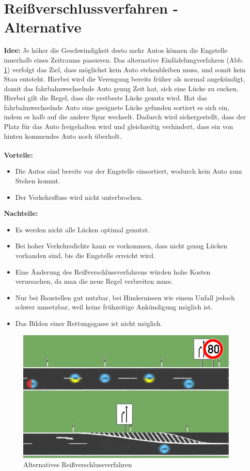 \section{Reißverschlussverfahren - Alternative}
\textbf{Idee:} Je höher die Geschwindigkeit desto mehr Autos können die Engstelle innerhalb eines Zeitraums passieren. Das alternative Einfädelungverfahren (Abb. \ref{fig:alternative}) verfolgt das Ziel, dass möglichst kein Auto stehenbleiben muss, und somit kein Stau entsteht. Hierbei wird die Verengung bereits früher als normal angekündigt, damit das fahrbahnwechselnde Auto genug Zeit hat, sich eine Lücke zu suchen. Hierbei gilt die Regel, dass die erstbeste Lücke genutz wird. Hat das fahrbahnwechselnde Auto eine geeignete Lücke gefunden sortiert es sich ein, indem es halb auf die andere Spur wechselt. Dadurch wird sichergestellt, dass der Platz für das Auto freigehalten wird und gleichzeitig verhindert, dass ein von hinten kommendes Auto noch überholt. \\\\
\textbf{Vorteile:} 
\begin{itemize}
	\item Die Autos sind bereits vor der Engstelle einsortiert, wodurch kein Auto zum Stehen kommt.
\item Der Verkehrsfluss wird nicht unterbrochen.
\end{itemize}
\textbf{Nachteile:}
\begin{itemize}
	\item Es werden nicht alle Lücken optimal genutzt.
\item Bei hoher Verkehrsdichte kann es vorkommen, dass nicht genug Lücken vorhanden sind, bis die Engstelle erreicht wird.
\item Eine Änderung des Reißverschlussverfahrens würden hohe Kosten verursachen, da man die neue Regel verbreiten muss.
\item Nur bei Baustellen gut nutzbar, bei Hindernissen wie einem Unfall jedoch schwer umsetzbar, weil keine frühzeitige Ankündigung möglich ist.
\item Das Bilden einer Rettungsgasse ist nicht möglich.
\end{itemize}
\begin{figure}
	\centering
	\includegraphics[width=0.7\linewidth]{images/Alternative}
	\caption{Alternatives Reißverschlussverfahren}
	\label{fig:alternative}
\end{figure}
